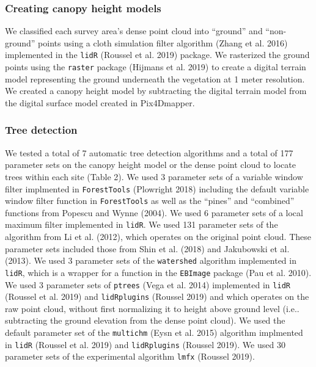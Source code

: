 \documentclass[]{article}
\begin{document}
\subsubsection{Creating canopy height
models}\label{creating-canopy-height-models}

We classified each survey area's dense point cloud into ``ground'' and
``non-ground'' points using a cloth simulation filter algorithm (Zhang
et al. 2016) implemented in the \texttt{lidR} (Roussel et al. 2019)
package. We rasterized the ground points using the \texttt{raster}
package (Hijmans et al. 2019) to create a digital terrain model
representing the ground underneath the vegetation at 1 meter resolution.
We created a canopy height model by subtracting the digital terrain
model from the digital surface model created in Pix4Dmapper.

\subsubsection{Tree detection}\label{tree-detection}

We tested a total of 7 automatic tree detection algorithms and a total
of 177 parameter sets on the canopy height model or the dense point
cloud to locate trees within each site (Table 2). We used 3 parameter
sets of a variable window filter implmented in \texttt{ForestTools}
(Plowright 2018) including the default variable window filter function
in \texttt{ForestTools} as well as the ``pines'' and ``combined''
functions from Popescu and Wynne (2004). We used 6 parameter sets of a
local maximum filter implemented in \texttt{lidR}. We used 131 parameter
sets of the algorithm from Li et al. (2012), which operates on the
original point cloud. These parameter sets included those from Shin et
al. (2018) and Jakubowski et al. (2013). We used 3 parameter sets of the
\texttt{watershed} algorithm implemented in \texttt{lidR}, which is a
wrapper for a function in the \texttt{EBImage} package (Pau et al.
2010). We used 3 parameter sets of \texttt{ptrees} (Vega et al. 2014)
implemented in \texttt{lidR} (Roussel et al. 2019) and
\texttt{lidRplugins} (Roussel 2019) and which operates on the raw point
cloud, without first normalizing it to height above ground level (i.e..
subtracting the ground elevation from the dense point cloud). We used
the default parameter set of the \texttt{multichm} (Eysn et al. 2015)
algorithm implmented in \texttt{lidR} (Roussel et al. 2019) and
\texttt{lidRplugins} (Roussel 2019). We used 30 parameter sets of the
experimental algorithm \texttt{lmfx} (Roussel 2019).
\end{document}

